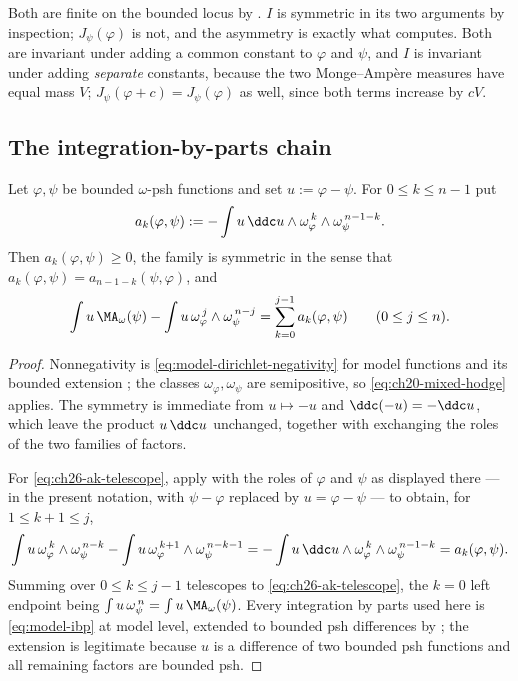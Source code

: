 Both are finite on the bounded locus by
.  \(I\) is symmetric in its two arguments
by inspection; \(J_\psi(\varphi)\) is not, and the asymmetry is exactly what
 computes.  Both are invariant under
adding a common constant to \(\varphi\) and \(\psi\), and \(I\) is invariant
under adding \emph{separate} constants, because the two Monge--Amp\`ere
measures have equal mass \(V\); \(J_\psi(\varphi+c)=J_\psi(\varphi)\) as
well, since both terms increase by \(cV\).

\subsection{The integration-by-parts chain}
\label{sec:ch26-ibp-chain}

\begin{lemma}
\label{lem:ch26-dirichlet-coefficients}
Let \(\varphi,\psi\) be bounded \(\omega\)-psh functions and set
\(u:=\varphi-\psi\).  For \(0\leq k\leq n-1\) put
\begin{equation}
\label{eq:ch26-ak}
 a_k(\varphi,\psi)
 :=-\int u\,\ddc u\wedge
     \omega_\varphi^{\,k}\wedge\omega_\psi^{\,n-1-k}.
\end{equation}
Then \(a_k(\varphi,\psi)\geq0\), the family is symmetric in the sense that
\(a_k(\varphi,\psi)=a_{n-1-k}(\psi,\varphi)\), and
\begin{equation}
\label{eq:ch26-ak-telescope}
 \int u\,\MA_\omega(\psi)-\int u\,
   \omega_\varphi^{\,j}\wedge\omega_\psi^{\,n-j}
 =\sum_{k=0}^{j-1}a_k(\varphi,\psi)
 \qquad(0\leq j\leq n).
\end{equation}
\end{lemma}

\begin{proof}
Nonnegativity is \eqref{eq:model-dirichlet-negativity} for model functions
and its bounded extension ; the classes
\(\omega_\varphi,\omega_\psi\) are semipositive, so
\eqref{eq:ch20-mixed-hodge} applies.  The symmetry is immediate from
\(u\mapsto-u\) and \(\ddc(-u)=-\ddc u\), which leave the product
\(u\,\ddc u\) unchanged, together with exchanging the roles of the two
families of factors.

For \eqref{eq:ch26-ak-telescope}, apply  with the
roles of \(\varphi\) and \(\psi\) as displayed there --- in the present
notation, with \(\psi-\varphi\) replaced by \(u=\varphi-\psi\) --- to obtain,
for \(1\leq k+1\leq j\),
\[
 \int u\,\omega_\varphi^{\,k}\wedge\omega_\psi^{\,n-k}
 -\int u\,\omega_\varphi^{\,k+1}\wedge\omega_\psi^{\,n-k-1}
 =-\int u\,\ddc u\wedge\omega_\varphi^{\,k}\wedge\omega_\psi^{\,n-1-k}
 =a_k(\varphi,\psi).
\]
Summing over \(0\leq k\leq j-1\) telescopes to
\eqref{eq:ch26-ak-telescope}, the \(k=0\) left endpoint being
\(\int u\,\omega_\psi^{\,n}=\int u\,\MA_\omega(\psi)\).  Every integration by
parts used here is \eqref{eq:model-ibp} at model level, extended to bounded
psh differences by ; the extension is
legitimate because \(u\) is a difference of two bounded psh functions and all
remaining factors are bounded psh.
\end{proof}

